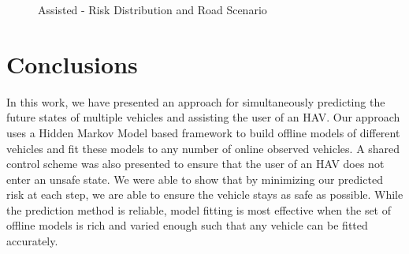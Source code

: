 \documentclass[letterpaper, 10 pt, conference]{ieeeconf}  %
\newcommand\NB[1]{$\spadesuit$\footnote{NB: #1}}
\begin{document}
\begin{figure}[ht!]
	\centering
	\vspace{-5pt}
	\caption{Assisted - Risk Distribution and Road Scenario}
	\label{fig:assist}
	\vspace{-5pt}
\end{figure}



\section{Conclusions} \label{sec:concs}
In this work, we have presented an approach for simultaneously predicting the future states of multiple vehicles and assisting the user of an HAV. Our approach uses a Hidden Markov Model based framework to build offline models of different vehicles and fit these models to any number of online observed vehicles. A shared control scheme was also presented to ensure that the user of an HAV does not enter an unsafe state. We were able to show that by minimizing our predicted risk at each step, we are able to ensure the vehicle stays as safe as possible. While the prediction method is reliable, model fitting is most effective when the set of offline models is rich and varied enough such that any vehicle can be fitted accurately.
\end{document}

